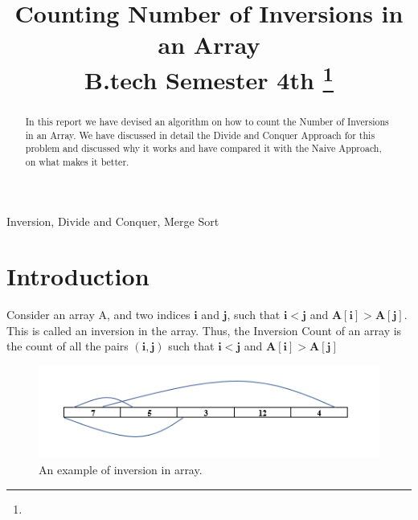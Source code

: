 \documentclass[conference]{IEEEtran}
\begin{document}
\title{Counting Number of Inversions in an Array\\
{\footnotesize B.tech Semester 4th}
\thanks{}
}

\author{
\and
{}
\and
{}
}

\maketitle

\noindent \begin{abstract}
In this report we have devised an algorithm on how to count the Number of Inversions in an Array.
We have discussed in detail the Divide and Conquer Approach for this problem and discussed why it works and have compared it with the Naive Approach, on what makes it better.
\end{abstract}

\noindent \begin{IEEEkeywords}
Inversion, Divide and Conquer, Merge Sort
\end{IEEEkeywords}

\section{\textbf{Introduction}}
\noindent Consider an array A, and two indices $\bm{i}$ and $\bm{j}$, such that $\bm{i}<\bm{j}$ and $\bm{A[i]} > \bm{A[j]}$. This is called an inversion in the array. Thus, the Inversion Count of an array is the count of all the pairs $\bm{(i,j)}$ such that $\bm{i}<\bm{j}$ and $\bm{A[i]}>\bm{A[j]}$ \\

\begin{figure}[htbp]
\centerline{\includegraphics{inversion.png}}
\caption{An example of inversion in array.}
\label{fig}
\end{figure}
\end{document}
